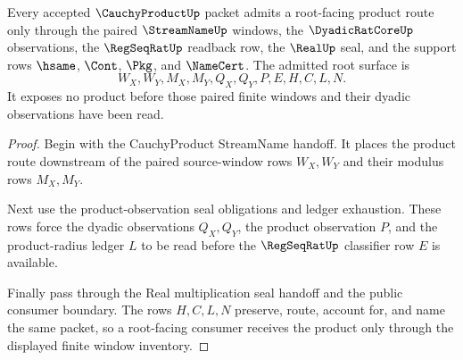 \begin{theorem}
\label{thm:cauchy-product-shared-window-root-admission}
Every accepted $\CauchyProductUp$ packet admits a root-facing product route only through the paired $\StreamNameUp$ windows, the $\DyadicRatCoreUp$ observations, the $\RegSeqRatUp$ readback row, the $\RealUp$ seal, and the support rows $\hsame$, $\Cont$, $\Pkg$, and $\NameCert$. The admitted root surface is
$$
W_X,W_Y,M_X,M_Y,Q_X,Q_Y,P,E,H,C,L,N.
$$
It exposes no product before those paired finite windows and their dyadic observations have been read.
\end{theorem}
\begin{proof}
Begin with the CauchyProduct StreamName handoff. It places the product route downstream of the paired source-window rows $W_X,W_Y$ and their modulus rows $M_X,M_Y$.

Next use the product-observation seal obligations and ledger exhaustion. These rows force the dyadic observations $Q_X,Q_Y$, the product observation $P$, and the product-radius ledger $L$ to be read before the $\RegSeqRatUp$ classifier row $E$ is available.

Finally pass through the Real multiplication seal handoff and the public consumer boundary. The rows $H,C,L,N$ preserve, route, account for, and name the same packet, so a root-facing consumer receives the product only through the displayed finite window inventory.
\end{proof}

